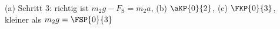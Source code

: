 (a) Schritt 3: richtig ist $m_2 g - F_\mathrm{S} = m_2 a$, (b) $\aKP{0}{2}$, (c) $\FKP{0}{3}$, kleiner als $m_2 g = \FSP{0}{3}$
